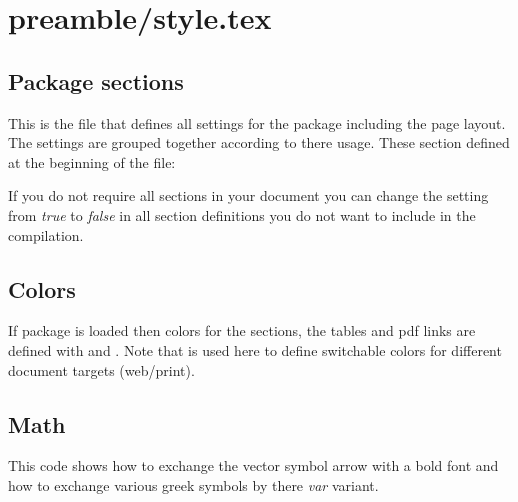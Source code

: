 
\section{preamble/style.tex}

\subsection{Package sections}

This is the file that defines all settings for the package including the page layout. The settings are grouped together according to there usage. 
These section defined at the beginning of the file:


If you do not require all sections in your document you can change the setting from \emph{true} to \emph{false} in all section definitions you do not want to include in the compilation.

\subsection{Colors}

If package  is loaded then colors for the sections, the tables and pdf links are defined with  and . Note that  is used here to define switchable colors for different document targets (web/print).


\subsection{Math}

This code shows how to exchange the vector symbol arrow with a bold font and how to exchange various greek symbols by there \emph{var} variant.


